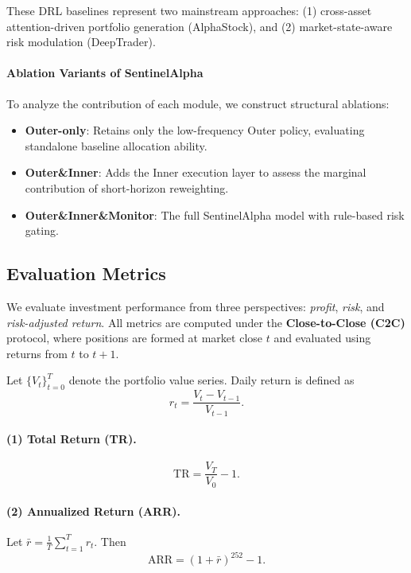 \documentclass[letterpaper]{article} %
\begin{document}
These DRL baselines represent two mainstream approaches: 
(1) cross-asset attention-driven portfolio generation (AlphaStock), and 
(2) market-state-aware risk modulation (DeepTrader).

\paragraph{Ablation Variants of SentinelAlpha}

To analyze the contribution of each module, we construct structural ablations:

\begin{itemize}
    \item \textbf{Outer-only}: Retains only the low-frequency Outer policy, evaluating standalone baseline allocation ability.
    
    \item \textbf{Outer\&Inner}: Adds the Inner execution layer to assess the marginal contribution of short-horizon reweighting.
    
    \item \textbf{Outer\&Inner\&Monitor}: The full SentinelAlpha model with rule-based risk gating.
\end{itemize}

\subsection{Evaluation Metrics}

We evaluate investment performance from three perspectives: \emph{profit}, \emph{risk}, and \emph{risk-adjusted return}. All metrics are computed under the \textbf{Close-to-Close (C2C)} protocol, where positions are formed at market close $t$ and evaluated using returns from $t$ to $t+1$.

Let $\{V_t\}_{t=0}^{T}$ denote the portfolio value series. Daily return is defined as
\begin{equation}
r_t = \frac{V_t - V_{t-1}}{V_{t-1}}.
\end{equation}

\paragraph{(1) Total Return (TR).}
\begin{equation}
\text{TR} = \frac{V_T}{V_0} - 1.
\end{equation}

\paragraph{(2) Annualized Return (ARR).}
Let $\bar r = \frac{1}{T}\sum_{t=1}^{T} r_t$. Then
\begin{equation}
\text{ARR} = (1 + \bar r)^{252} - 1.
\end{equation}
\end{document}
